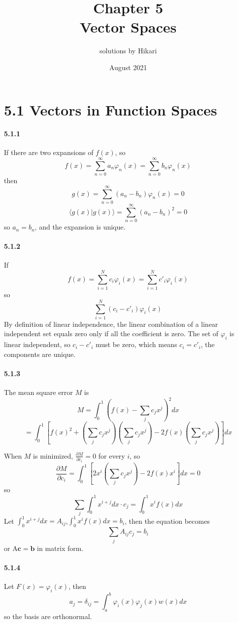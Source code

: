 \documentclass[a4paper]{article}
\title{Chapter 5\\Vector Spaces}
\author{solutions by Hikari}
\date{August 2021}
\begin{document}
\newcommand{\br}[2]{\langle#1|#2\rangle}
\newcommand{\brr}[2]{\left\langle#1|#2\right\rangle}
\newcommand{\pdv}[2]{\frac{\partial#1}{\partial#2}}
\newcommand{\M}{\mathrm}
\newcommand{\V}{\mathbf}
\newcommand{\VE}{\mathbf{\hat{e}}}

\maketitle

\section*{5.1 Vectors in Function Spaces}

\paragraph{5.1.1}
If there are two expansions of $f(x)$, so
\[
f(x)=\sum_{n=0}^\infty a_n\varphi_n(x)=\sum_{n=0}^\infty b_n\varphi_n(x)
\]
then
\[
g(x)=\sum_{n=0}^\infty(a_n-b_n)\varphi_n(x)=0
\]
\[
\br{g(x)}{g(x)}=\sum_{n=0}^\infty(a_n-b_n)^2=0
\]
so $a_n=b_n$, and the expansion is unique.

\paragraph{5.1.2}
If 
\[
f(x)=\sum_{i=1}^Nc_i\varphi_i(x)=\sum_{i=1}^Nc'_i\varphi_i(x)
\]
so 
\[
\sum_{i=1}^N(c_i-c'_i)\varphi_i(x)
\]
By definition of linear independence, the linear combination of a linear independent set equals zero only if all the coefficient is zero. The set of $\varphi_i$ is linear independent, so $c_i-c'_i$ must be zero, which means $c_i=c'_i$, the components are unique.

\paragraph{5.1.3}
The mean square error $M$ is
\[
M=\int_0^1(f(x)-\sum_jc_jx^j)^2dx
\]
\[
=\int_0^1\left[f(x)^2+(\sum_jc_jx^j)(\sum_jc_jx^j)-2f(x)(\sum_jc_jx^j) \right]dx
\]

When $M$ is minimized, $\pdv{M}{c_i}=0$ for every $i$, so
\[
\pdv{M}{c_i}=\int_0^1\left[2x^i(\sum_jc_jx^j)-2f(x)x^i \right]dx=0
\]
so
\[
\sum_j\int_0^1x^{i+j}dx\cdot c_j=\int_0^1x^if(x)dx
\]
Let $\int_0^1x^{i+j}dx=A_{ij}$,\quad $\int_0^1x^if(x)dx=b_i$, then the equation becomes
\[
\sum_jA_{ij}c_j=b_i
\]
or $\M{A}\V{c}=\V{b}$ in matrix form.

\paragraph{5.1.4}
Let $F(x)=\varphi_i(x)$, then
\[
a_j=\delta_{ij}=\int_a^b\varphi_i(x)\varphi_{j}(x)w(x)dx
\]
so the basis are orthonormal. 
\end{document}
